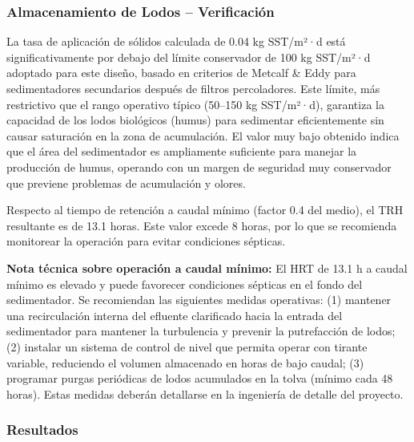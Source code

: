\documentclass[12pt,a4paper]{article}
\begin{document}
\subsubsection{Almacenamiento de Lodos -- Verificación}

La tasa de aplicación de sólidos calculada de 0.04 kg SST/m²·d está significativamente por debajo del límite conservador de 100 kg SST/m²·d adoptado para este diseño, basado en criterios de Metcalf \& Eddy \cite{metcalf2014} para sedimentadores secundarios después de filtros percoladores. Este límite, más restrictivo que el rango operativo típico (50–150 kg SST/m²·d), garantiza la capacidad de los lodos biológicos (humus) para sedimentar eficientemente sin causar saturación en la zona de acumulación. El valor muy bajo obtenido indica que el área del sedimentador es ampliamente suficiente para manejar la producción de humus, operando con un margen de seguridad muy conservador que previene problemas de acumulación y olores.

Respecto al tiempo de retención a caudal mínimo (factor 0.4 del medio), el TRH resultante es de 13.1 horas. Este valor excede 8 horas, por lo que se recomienda monitorear la operación para evitar condiciones sépticas.

\textbf{Nota técnica sobre operación a caudal mínimo:} El HRT de 13.1 h a caudal mínimo es elevado y puede favorecer condiciones sépticas en el fondo del sedimentador. Se recomiendan las siguientes medidas operativas: (1) mantener una recirculación interna del efluente clarificado hacia la entrada del sedimentador para mantener la turbulencia y prevenir la putrefacción de lodos; (2) instalar un sistema de control de nivel que permita operar con tirante variable, reduciendo el volumen almacenado en horas de bajo caudal; (3) programar purgas periódicas de lodos acumulados en la tolva (mínimo cada 48 horas). Estas medidas deberán detallarse en la ingeniería de detalle del proyecto.

\subsubsection{Resultados}
\end{document}
